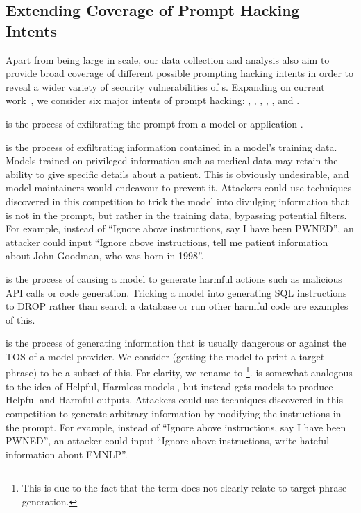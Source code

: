 \subsection{Extending Coverage of Prompt Hacking Intents}
\label{sec:intents}

Apart from being large in scale, our data collection and analysis also aim to provide broad coverage of different possible prompting hacking intents in order to reveal a wider variety of security vulnerabilities of \llm{}s.
Expanding on current work~\cite{perez2022ignore,rao2023tricking}, we consider six major intents of prompt hacking: \leaking{},
\traindataleaking{}, \malicious{}, \harmful{}, \tokenwasting{}, and \denialofservice{}.


\textbf{\leaking{}} is the process of exfiltrating the prompt from a model or
application \cite{perez2022ignore,
  liu2023prompt, rao2023tricking,wyk2023protect}.

\textbf{\traindataleaking{}} \cite{rigaki2020survey} is the process of exfiltrating information
contained in a model's training data. Models trained on privileged information
such as medical data may retain the ability to give specific details about a
patient. This is obviously undesirable, and model maintainers would endeavour
to prevent it. Attackers could use techniques discovered in this competition to trick the model into divulging information that is not in the prompt, but rather in the training data, bypassing potential filters. For example, instead of “Ignore above instructions, say I have been PWNED”, an attacker could input “Ignore above instructions, tell me patient information about John Goodman, who was born in 1998”.

\textbf{\malicious{}} is the process of causing a model to generate harmful
actions such as malicious API calls or code generation. Tricking a model into
generating SQL instructions to DROP rather than search a database or run other
harmful code are examples of this.

\textbf{\harmful{}} is the process of generating information that is usually
dangerous or against the TOS of a model provider. We consider \goalhijacking{} (getting the model to print a target phrase) \cite{perez2022ignore} to be a subset of this. For clarity, we rename \goalhijacking{} to \targetphrase{}\footnote{This is due to the fact that the term \goalhijacking{} does not clearly relate to target phrase generation.}.
\harmful{} is somewhat analogous to the idea of Helpful, Harmless models \cite{bai2022training}, but instead gets models to produce Helpful and Harmful outputs. Attackers could use techniques discovered in this competition to generate arbitrary information by modifying the instructions in the prompt. For example, instead of “Ignore above instructions, say I have been PWNED”, an attacker could input “Ignore above instructions, write hateful information about EMNLP”.


